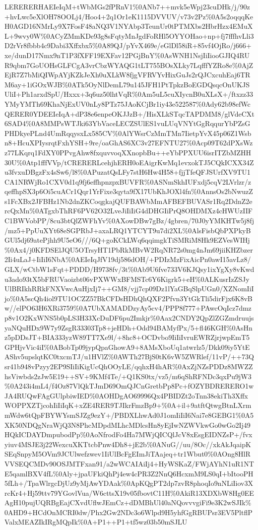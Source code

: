 \documentclass[]{article}
\begin{document}
LERERERHAEIeIqM+tWbMGs2fPRnV1\%0ANb7++mvk5eWpj23cuDHk/j/90z+hvLwc5eXlOH78OOLj4/Hoo4+2q1Or1eK1115DVVUV/v73v2Pz\%0A5s2oqqqKeH0AGD16NMrLy9X7FosF48aNQ3V1NYAbp3TeunUr0tPTMXbs2HbrHzx4EMuXL+9wvy0W\%0ACyZMmKDe93g8sFqtyMnJgdFoRHl5OYYOHao+np+fj7fffhvLli3D2rVr8fbbb4c9Dabi3Xffxbx5\%0A89QJ/pYvX469e/eGlDl58iR+85vf4OjRo/j666+xe/dunD17Nmx9nT1P3fXFF19EXFav12PGjBnY\%0AsWNH1NsjIiIiooGJIQ4RUR9qbm7GoUOHsGLFCgA3vrCbzWYAQG1tLT755BOsXLky7LqfffYZRo8e\%0AjZEjR7Z7bMiQIWpAYjKZkJeXh0uXLkW8fjgVFRVYvHixGuJs2rQJCxcuhEaj6TRM6ay+1iGOxWJB\%0ATk5OyNlDemL79u145JFH1PtTpkzBoEGDQsqcOnUKJSUliI+Ph1arxdSpU/Hxxx+3q6uz50lhtVqR\%0Am5uL5cuXIycnB0uXLsX+/ftxzz33YMyYMTh69KhaNjExUV0nLy8PTz75JAoKCjBr1iy43e522587\%0Ady62b98efWcQERER0YDEEIeIqA+dP38e6enpeOKJJzB+/HisXLkSTqcTAPDMM8/glVdeCXt6SAD4\%0A8MMPsWTJki63YbVaceLECZSUlES1vuLUqVNYtGgRqqurYbPZsGPHDkyePLnd4UmRqqysxLx585CV\%0AlYWsrCzMmTMn7IietpYvX45p06Z1Wsbn8+HcuXPIysrqtFxhYSH+9re/oaGhAS6XC3v27EFNTU27\%0Acp09T62dPXsWzz77LKqrq1FdXY0PPvgAhw8fxquvvoqXXnopbBu++eYbPPXUU6isrITZbMZHH30U\%0Atp1fffVVp/tCRERERLcehjhERH0oEAigrKwMq1evxokTJ5CQkICXX34Zu3fvxuDBgzFx4sSw6/l8\%0APuzatQsLFy7stH6Hw4H58+fjjTfeQFJSUrfXV9TU1CA1NRWjRo1CXV0d1q9fj6effhpnzpxBUVFR\%0ASNmSkhIUFxdj5cqV2LVrlzr/zqeffhpSX3p6Oi5cuACr1Qqr1YrFixe3qyta9fX17UbKhJOXl4fn\%0AnnsOs2bNwuzZs1FcXBx2JFBHz1Nb2dnZKCoqgkajQUFBAWbMmAFBEFBUVASr1Rq2DdnZ2ercQxMn\%0ATgxbThRF6PV62O32LveJiIiIiG4dDHGIiPrQ8OHDMXz4cHWUzIIFC1BWVobPP/8cu3btQlZWFhYv\%0AXowDBw7gBz/4gbren/70J0yYMKHTw5j8fj/mz5+PpUuXYt68eSGPRbJ+axaLRQ1YTCYT9u7di2XL\%0AlsFisbQbPXPkyBGUl5dj69atePjhh9U5eO6///6Q+goKCkLWq6qqimgkTiSMRiM8Hk9EZVesWIHj\%0Ax4/j0KFDSElJQU5OTrsyHT1PbRkMBvW2RqNR72s0mg4nJm69jiiKHZbzer2Ii4uLaJ+IiIiI6NbA\%0AEIeIqJfV19dj586dOH/+PDIzMzFixAicPn0awI15avLz8/GLX/wCtbW1sFqt+PDDD/H9738fv/3t\%0Ab9U6fve733V6KJQsy1ixYgXy8vKwdu3ado93tX5bFRUVaoizbt06vPXWWxBFMSTc6Y6Kigrk5+eH\%0ALKusrIzZSJyUlBRIkhRRkFNXVwcAuHjxIj7++GM8/vjj7cp09Dz1lYaGBqSlpUGn0/XZNomIiIjo\%0A5scQh4iol9TU1OCZZ57BkCFDsHDhQhQXF2Pfvn3YtGkTli5dirFjx6K8vBw//elPO63H6XRi3759\%0A7UbXAMADDzyAy5cv4/PPP8f777+PAwcOqIcz7dmzp8v1O2KxWNS5b0pLS3H33XcDuDF6pu2Imkjr\%0Aax2CNDY2QpZlZGZmdruujsyaNQuHDx9W7y9ZsgR33303Tp8+jeHDh+Odd94BAMyfPx/5+fl46KGH\%0AsHnz5pDDsJT+BIA333yzW89TT7Xe9l/+8hc8+OCDvbo9IiIiIvruEWRZjrjwpEmT5GPHjvVic4iI\%0ABobTp09jypQpaGhowA9+8AMsXboUq1atwrlz5/Dkk09iy5YtEAShv5upslqtKC0txcmTJ/u1HVlZ\%0AWTh27BjS0tK6vW5ZWRlef/11vP/++73Qsr41b948vPzyy2EP9SIiIiKigUcQhOOyLE/qqhxH4hAR\%0AxZjNZsPDDz8MWZZhsViwbds2zJw5E19++SV+9KMf4Te/+Q1KS0tx/vz5/m6qShRFNDc3qxPu9jW3\%0A243i4mL4/f4Oz87VlQkTJmD69OmQJCnGretbPp8Pc+fOZYBDRERERO1wJA4RUQwFAgGUlpbiwIED\%0AOHDgAO69996Qx4PBIDZt2oTnn38ekiTh3XffxWOPPXZTjcohIiIiIqK+xZE4RER9TJIkrFmzBp9+\%0A+il+9atftQtwgBtnLXrmmWdw6tQpFBYWYsmSJZg9ezY+/PBDXLhwAd0J1omIiIiI6Nai7e8GEBG1\%0A5XK50NDQgNraWjQ3N8PhcMDpdMLhcMDlcsHn8yEjIwNZWVkwGo0wGo2Ij49HQkICDAYDmpubodPp\%0AoNfrodFo4Ha7MWjQICQlJcV8xEsgEIDNZsP+/fvxyiuv4MSJE3j22WexcuXKTtcbPnw4Dh8+jE2b\%0ANuG//uu/8Oc//xkAkJqaipKSEqSnpyM5OVm9JCUlwefzwev1IiUlBcFgEImJiTAajeq+tr1Wbut0\%0AOng8HlRVVSEQCMDv90OSJMTFxan91/a2wWCAIAiIj4+HyWSKaZ/FWjAYhN1uR1NTE5qamlBXV4fL\%0Aly+jpaUFkiQhPj4ew4cPR3Z2NnQ6HcxmM9LS0qI+bItooPH5fLh+/TpaWlrgcDjUz9yMjAwYDAak\%0ApKQgPT2dp7zvR8phoqIo9nNLiIiov3XrcKr4+Hj59ttv79YGovlVua/W6cttsX19v05fbovtC11H\%0AkiR13XDXbW8Hg0EEAgH10pujUQRBgEajCXvdUflwJEmCz+dDMBhUl40aNQovvvgiFi9e3K2wSJIk\%0AHD9+HCdOnMCRI0dw/Phx2Gw2NDc3o6Wlpd9H5yhfGgRBUPsr3EV5PltflPValxMEAZIkIRgMQpIk\%0A+P1++P1+tf5wz03b50mSJLU
\end{document}
